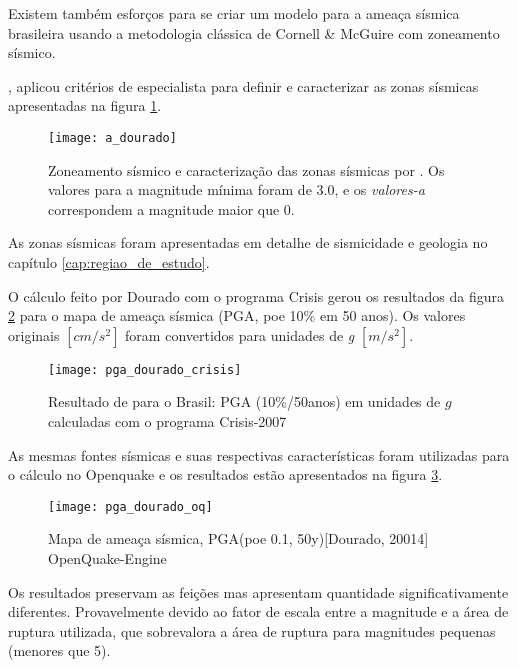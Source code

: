 Existem também esforços \citep{dourado_2014} para se criar um modelo para a ameaça sísmica brasileira
usando a metodologia clássica de Cornell \& McGuire com zoneamento sísmico. 

\citet{dourado_2014}, aplicou critérios de especialista para definir e caracterizar as zonas sísmicas
apresentadas na figura \ref{fig:a_dourado}.

\begin{figure}[H]
  \centering
  \texttt{[image: a\_dourado]} 
  \caption{Zoneamento sísmico e caracterização das zonas sísmicas por \citep{dourado_2014}.
  Os valores para a magnitude mínima foram de 3.0, e os \emph{valores-a} correspondem a magnitude maior que 0.}
  \label{fig:a_dourado} 
\end{figure}

As zonas sísmicas foram apresentadas em detalhe de sismicidade e geologia no capítulo \ref{cap:regiao_de_estudo}.

O cálculo feito por Dourado com o programa Crisis \citep{crisis_2007} gerou os resultados da figura \ref{fig:pga_dourado}
para o mapa de ameaça sísmica (PGA, poe 10\% em 50 anos). Os valores originais  $[cm/s^2]$ foram convertidos
para unidades de \emph{g} $[m/s^2]$.

\begin{figure}[H]
  \centering
  \texttt{[image: pga\_dourado\_crisis]} 
  \caption{Resultado de \citet{dourado_2014} para o Brasil: PGA (10\%/50anos) em unidades de $g$ calculadas com o programa
  Crisis-2007}
  \label{fig:pga_dourado} 
\end{figure}

As mesmas fontes sísmicas e suas respectivas características foram utilizadas para o cálculo no
Openquake e os resultados estão apresentados na figura \ref{fig:pga_dourado_oq}.

\begin{figure}[H]
  \centering
  \texttt{[image: pga\_dourado\_oq]} 
  \caption{Mapa de ameaça sísmica, PGA(poe 0.1, 50y)[Dourado, 20014] OpenQuake-Engine }
  \label{fig:pga_dourado_oq} 
\end{figure}

Os resultados preservam as feições mas apresentam quantidade significativamente diferentes.
Provavelmente devido ao fator de escala entre a magnitude e a área de ruptura utilizada,
que sobrevalora a área de ruptura para magnitudes pequenas (menores que 5).


